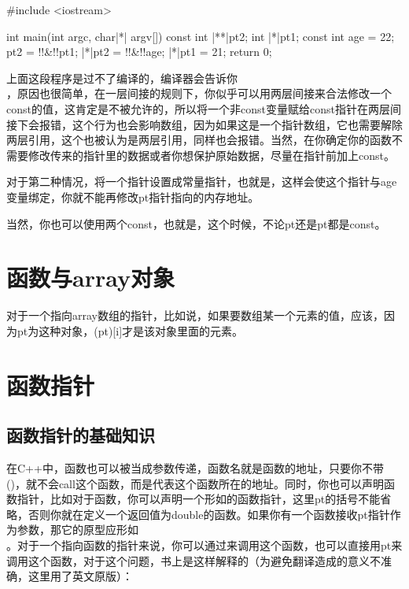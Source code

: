 \begin{cpp}
#include <iostream>

int main(int argc, char|*| argv[]) {
    const int |**|pt2;
    int |*|pt1;
    const int age = 22;
    pt2 = !!&!!pt1;
    |*|pt2 = !!&!!age;
    |*|pt1 = 21;
    return 0;
}
\end{cpp}

上面这段程序是过不了编译的，编译器会告诉你\\ ，原因也很简单，在一层间接的规则下，你似乎可以用两层间接来合法修改一个const的值，这肯定是不被允许的，所以将一个非const变量赋给const指针在两层间接下会报错，这个行为也会影响数组，因为如果这是一个指针数组，它也需要解除两层引用，这个也被认为是两层引用，同样也会报错。当然，在你确定你的函数不需要修改传来的指针里的数据或者你想保护原始数据，尽量在指针前加上const。

对于第二种情况，将一个指针设置成常量指针，也就是，这样会使这个指针与age变量绑定，你就不能再修改pt指针指向的内存地址。

当然，你也可以使用两个const，也就是，这个时候，不论pt还是\fira{*}pt都是const。

\addtocounter{section}{5}

\section{函数与array对象}

对于一个指向array数组的指针，比如说，如果要数组某一个元素的值，应该，因为\fira{*}pt为这种对象，(\fira{*}pt)[i]才是该对象里面的元素。

\addtocounter{section}{1}

\section{函数指针}

\subsection{函数指针的基础知识}

在C++中，函数也可以被当成参数传递，函数名就是函数的地址，只要你不带()，就不会call这个函数，而是代表这个函数所在的地址。同时，你也可以声明函数指针，比如对于函数，你可以声明一个形如的函数指针，这里\fira{*}pt的括号不能省略，否则你就在定义一个返回值为double\fira{*}的函数。如果你有一个函数接收pt指针作为参数，那它的原型应形如\\ \codeline{));}。对于一个指向函数的指针来说，你可以通过来调用这个函数，也可以直接用pt来调用这个函数，对于这个问题，书上是这样解释的（为避免翻译造成的意义不准确，这里用了英文原版）：

